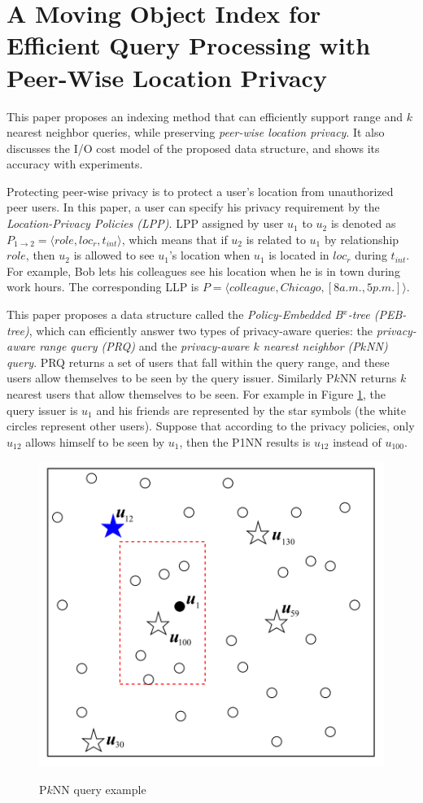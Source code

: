 \documentclass[paper=a4, fontsize=18pt]{article} %
\numberwithin{equation}{section} %
\numberwithin{figure}{section} %
\numberwithin{table}{section} %
\begin{document}
\section{A Moving Object Index for Efficient Query Processing with Peer-Wise Location Privacy \cite{LJZLJ11}}

This paper proposes an indexing method that can efficiently support range and $k$ nearest neighbor queries, while preserving \emph{peer-wise location privacy}. It also discusses the I/O cost model of the proposed data structure, and shows its accuracy with experiments.

Protecting peer-wise privacy is to protect a user's location from unauthorized peer users. In this paper, a user can specify his privacy requirement by the \emph{Location-Privacy Policies (LPP)}. LPP assigned by user $u_1$ to $u_2$ is denoted as $P_{1 \rightarrow 2} = \langle role, loc_r, t_{int} \rangle$, which means that if $u_2$ is related to $u_1$ by relationship $role$, then $u_2$ is allowed to see $u_1$'s location when $u_1$ is located in $loc_r$ during $t_{int}$. For example, Bob lets his colleagues see his location when he is in town during work hours. The corresponding LLP is $P = \langle colleague, Chicago, [8 a.m., 5 p.m.] \rangle$.

This paper proposes a data structure called the\emph{ Policy-Embedded B$^x$-tree (PEB-tree)}, which can efficiently answer two types of privacy-aware queries: the \emph{privacy-aware range query (PRQ)} and the \emph{privacy-aware $k$ nearest neighbor (P$k$NN) query}. PRQ returns a set of users that fall within the query range, and these users allow themselves to be seen by the query issuer. Similarly P$k$NN returns $k$ nearest users that allow themselves to be seen. For example in Figure \ref{fig:PEB_example}, the query issuer is $u_1$ and his friends are represented by the star symbols (the white circles represent other users). Suppose that according to the privacy policies, only $u_{12}$ allows himself to be seen by $u_1$, then the P1NN results is $u_{12}$ instead of $u_{100}$.

\begin{figure}[h]
  \centering
  \includegraphics[width=.5\linewidth]{74_peb_example.png}\\
  \caption{P$k$NN query example}\label{fig:PEB_example}
\end{figure}
\end{document}
